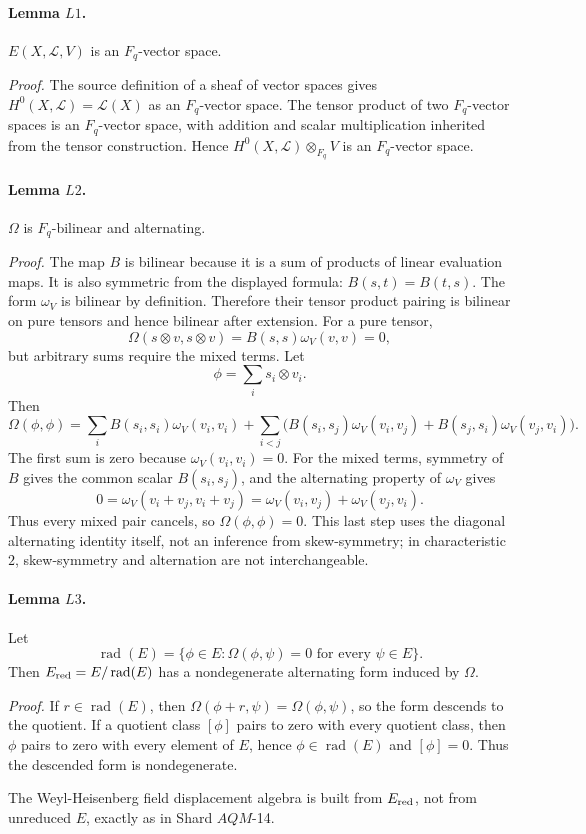 \paragraph{Lemma \(L1\).}
\(E(X,\mathcal L,V)\) is an \(F_q\)-vector space.

\emph{Proof.}
The source definition of a sheaf of vector spaces gives
\(H^0(X,\mathcal L)=\mathcal L(X)\) as an \(F_q\)-vector space.  The tensor
product of two \(F_q\)-vector spaces is an \(F_q\)-vector space, with addition
and scalar multiplication inherited from the tensor construction.  Hence
\(H^0(X,\mathcal L)\otimes_{F_q}V\) is an \(F_q\)-vector space.

\paragraph{Lemma \(L2\).}
\(\Omega\) is \(F_q\)-bilinear and alternating.

\emph{Proof.}
The map \(B\) is bilinear because it is a sum of products of linear evaluation
maps.  It is also symmetric from the displayed formula:
\(B(s,t)=B(t,s)\).  The form \(\omega_V\) is bilinear by definition.
Therefore their tensor product pairing is bilinear on pure tensors and hence
bilinear after extension.  For a pure tensor,
\[
  \Omega(s\otimes v,s\otimes v)=B(s,s)\omega_V(v,v)=0,
\]
but arbitrary sums require the mixed terms.  Let
\[
  \phi=\sum_i s_i\otimes v_i .
\]
Then
\[
  \Omega(\phi,\phi)
  =
  \sum_i B(s_i,s_i)\omega_V(v_i,v_i)
  +
  \sum_{i<j}
  \bigl(
    B(s_i,s_j)\omega_V(v_i,v_j)
    +
    B(s_j,s_i)\omega_V(v_j,v_i)
  \bigr).
\]
The first sum is zero because \(\omega_V(v_i,v_i)=0\).  For the mixed terms,
symmetry of \(B\) gives the common scalar \(B(s_i,s_j)\), and the alternating
property of \(\omega_V\) gives
\[
  0=\omega_V(v_i+v_j,v_i+v_j)
   =\omega_V(v_i,v_j)+\omega_V(v_j,v_i).
\]
Thus every mixed pair cancels, so \(\Omega(\phi,\phi)=0\).  This last step uses
the diagonal alternating identity itself, not an inference from skew-symmetry;
in characteristic \(2\), skew-symmetry and alternation are not interchangeable.

\paragraph{Lemma \(L3\).}
Let
\[
  \operatorname{rad}(E)=
  \{\phi\in E:\Omega(\phi,\psi)=0\text{ for every }\psi\in E\}.
\]
Then \(E_{\rm red}=E/\operatorname{rad}(E)\) has a nondegenerate alternating
form induced by \(\Omega\).

\emph{Proof.}
If \(r\in\operatorname{rad}(E)\), then
\(\Omega(\phi+r,\psi)=\Omega(\phi,\psi)\), so the form descends to the
quotient.  If a quotient class \([\phi]\) pairs to zero with every quotient
class, then \(\phi\) pairs to zero with every element of \(E\), hence
\(\phi\in\operatorname{rad}(E)\) and \([\phi]=0\).  Thus the descended form is
nondegenerate.

The Weyl-Heisenberg field displacement algebra is built from
\(E_{\rm red}\), not from unreduced \(E\), exactly as in
Shard \(AQM\)-14.
